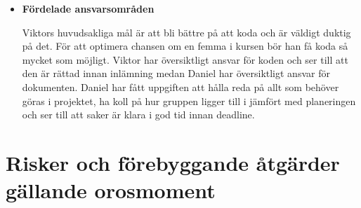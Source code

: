 \documentclass{mall}
\begin{document}
\begin{itemize}
\item \textbf{Fördelade ansvarsområden}
  
  Viktors huvudsakliga mål är att bli bättre på att koda och är väldigt duktig på det. För att optimera chansen om en femma i kursen bör han få koda så mycket som möjligt. Viktor har översiktligt ansvar för koden och ser till att den är rättad innan inlämning medan Daniel har översiktligt ansvar för dokumenten. Daniel har fått uppgiften att hålla reda på allt som behöver göras i projektet, ha koll på hur gruppen ligger till i jämfört med planeringen och ser till att saker är klara i god tid innan deadline. 

\end{itemize}

\section{Risker och förebyggande åtgärder gällande orosmoment}
\end{document}
